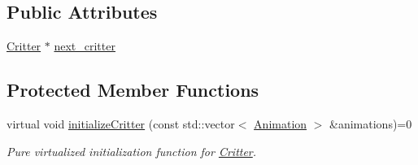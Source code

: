 \subsection*{Public Attributes}
\begin{DoxyCompactItemize}
\item 
\hyperlink{class_critter}{Critter} $\ast$ \hyperlink{class_critter_a6017fbb8c863a2456f43b88996720927}{next\+\_\+critter}
\end{DoxyCompactItemize}
\subsection*{Protected Member Functions}
\begin{DoxyCompactItemize}
\item 
virtual void \hyperlink{class_critter_ad425da71f01445ee175e5f98d94ca0ba}{initialize\+Critter} (const std\+::vector$<$ \hyperlink{class_animation}{Animation} $>$ \&animations)=0
\begin{DoxyCompactList}\small\item\em Pure virtualized initialization function for \hyperlink{class_critter}{Critter}. \end{DoxyCompactList}\end{DoxyCompactItemize}
